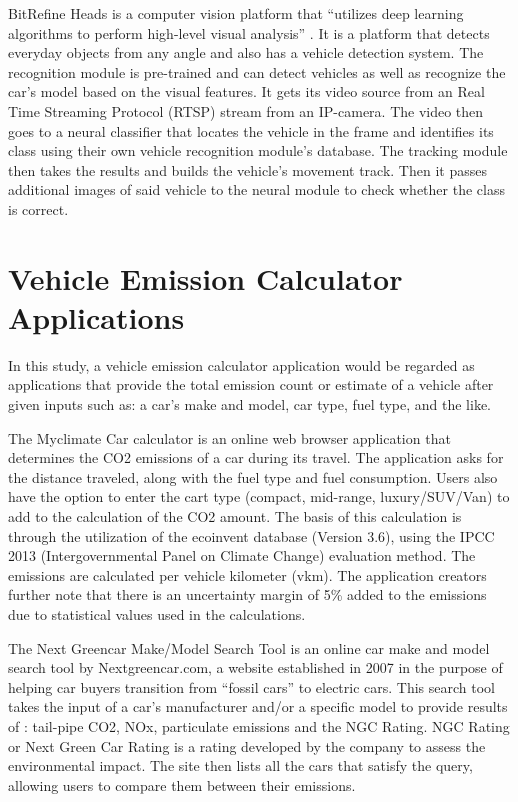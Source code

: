 	BitRefine Heads is a computer vision platform that “utilizes deep learning algorithms to perform high-level visual analysis” . It is a platform that detects everyday objects from any angle and also has a vehicle detection system. The recognition module is pre-trained and can detect vehicles as well as recognize the car’s model based on the visual features. It gets its video source from an Real Time Streaming Protocol (RTSP) stream from an IP-camera. The video then goes to a neural classifier that locates the vehicle in the frame and identifies its class using their own vehicle recognition module’s database.  The tracking module then takes the results and builds the vehicle’s movement track. Then it passes additional images of said vehicle to the neural module to check whether the class is correct. \cite{BITREFINE_ND}


\section{Vehicle Emission Calculator Applications}
	In this study, a vehicle emission calculator application would be regarded as applications that provide the total emission count or estimate of a vehicle after given inputs such as: a car’s make and model, car type, fuel type, and the like.

	The Myclimate Car calculator is an online web browser application that determines the CO2 emissions of a car during its travel. The application asks for the distance traveled, along with the fuel type and fuel consumption. Users also have the option to enter the cart type (compact, mid-range, luxury/SUV/Van) to add to the calculation of the CO2 amount.  The basis of this calculation is through the utilization of the ecoinvent database (Version 3.6), using the IPCC 2013  (Intergovernmental Panel on Climate Change) evaluation method. The emissions are calculated per vehicle kilometer (vkm). The application creators further note that there is an uncertainty margin of 5\% added to the emissions due to statistical values used in the calculations. \cite{MCF_ND}

	The Next Greencar Make/Model Search Tool is an online car make and model search tool by Nextgreencar.com, a website established in 2007 in the purpose of helping car buyers transition from “fossil cars” to electric cars. This search tool takes the input of a car’s manufacturer and/or a specific model to provide results of : tail-pipe CO2, NOx, particulate emissions and the NGC Rating. NGC Rating or Next Green Car Rating is a rating developed by the company to assess the environmental impact. \cite{Lilly_ND}  The site then lists all the cars that satisfy the query, allowing users to compare them between their emissions. 


